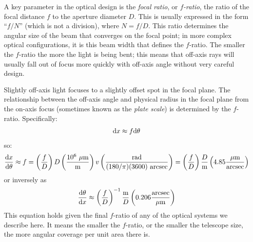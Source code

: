 A key parameter in the optical design is the {\it focal ratio}, or
{\it $f$-ratio}, the ratio of the focal distance $f$ to the aperture
diameter $D$. This is usually expressed in the form ``$f/N$'' (which
is not a division), where $N = f/D$. This ratio determines the angular
size of the beam that converges on the focal point; in more complex
optical configurations, it is this beam width that defines the
$f$-ratio. The smaller the $f$-ratio the more the light is being bent;
this means that off-axis rays will usually fall out of focus more
quickly with off-axis angle without very careful design.

Slightly off-axis light focuses to a slightly offset spot in the focal
plane. The relationship between the off-axis angle and physical radius
in the focal plane from the on-axis focus (sometimes known as the {\it
plate scale}) is determined by the $f$-ratio. Specifically:
\begin{equation}
{\rm d}x \approx f {\rm d}\theta
\end{equation}
so:
\begin{equation}
\frac{{\rm d}x}{{\rm d}\theta} \approx f
= \left(\frac{f}{D}\right) D
\left(\frac{10^6~\mu{\rm m}}{{\rm m}}\right)v
\left(\frac{\rm rad}{(180/\pi)(3600)~{\rm arcsec}}\right)
= \left(\frac{f}{D}\right) \frac{D}{{\rm m}}
\left(4.85 \frac{\mu{\rm m}}{\rm arcsec}\right)
\end{equation}
or inversely as 
\begin{equation}
\frac{{\rm d}\theta}{{\rm d}x} \approx 
\left(\frac{f}{D}\right)^{-1} \frac{{\rm m}}{D}
\left(0.206\frac{\rm arcsec}{\mu{\rm m}}\right)
\end{equation}
This equation holds given the final $f$-ratio of any of the optical
systems we describe here. It means the smaller the $f$-ratio, or the
smaller the telescope size, the more angular coverage per unit area
there is.

